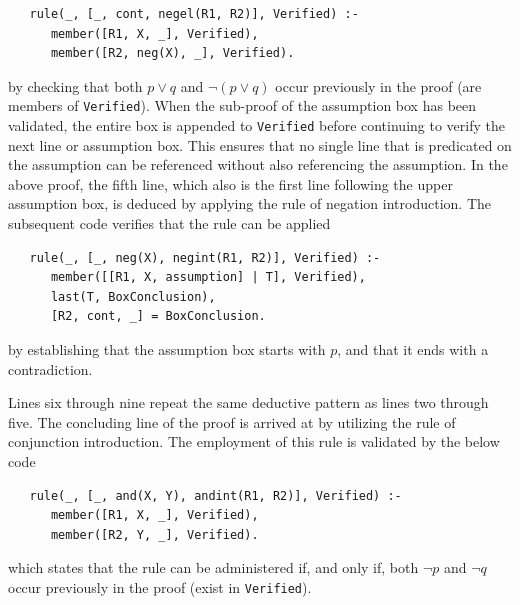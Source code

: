 \documentclass[a4paper, 11pt]{article}
\begin{document}
\begin{enumerate}
\begin{verbatim}
   rule(_, [_, cont, negel(R1, R2)], Verified) :-
      member([R1, X, _], Verified),
      member([R2, neg(X), _], Verified).
\end{verbatim}

            by checking that both $p \vee q$ and 
            $\neg(p \vee q)$ occur previously in the proof
            (are members of \texttt{Verified}). When the
            sub-proof of the assumption box has been
            validated, the entire box is appended to
            \texttt{Verified} before continuing to verify the
            next line or assumption box. This ensures that no
            single line that is predicated on the assumption
            can be referenced without also referencing the
            assumption. In the above proof, the fifth line, 
            which also is the first line following the
            upper assumption box, is deduced by applying the
            rule of negation introduction. The subsequent code
            verifies that the rule can be applied

\begin{verbatim}
   rule(_, [_, neg(X), negint(R1, R2)], Verified) :-
      member([[R1, X, assumption] | T], Verified),
      last(T, BoxConclusion),
      [R2, cont, _] = BoxConclusion.
\end{verbatim}

            by establishing that the assumption box starts
            with $p$, and that it ends with a contradiction.
            \bigbreak

            Lines six through nine repeat the 
            same deductive pattern as lines two through five.
            The concluding line of the proof is arrived at by
            utilizing the rule of conjunction introduction.
            The employment of this rule is validated by the
            below code

\begin{verbatim}
   rule(_, [_, and(X, Y), andint(R1, R2)], Verified) :-
      member([R1, X, _], Verified),
      member([R2, Y, _], Verified).
\end{verbatim}

            which states that the rule can be administered if,
            and only if, both $\neg p$ and $\neg q$ occur
            previously in the proof (exist in
            \texttt{Verified}).

   \end{enumerate}
\end{document}
